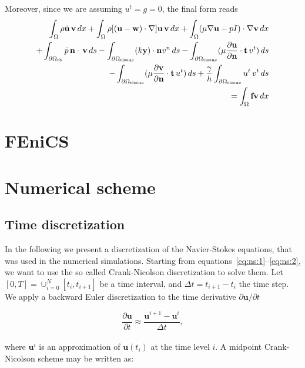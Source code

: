 \documentclass[11pt,a4paper,titlepage]{report}
\begin{document}
Moreover, since we are assuming $u^t = g = 0$, the final form reads
\begin{equation}
\begin{split}
 \int_{\Omega} \rho \dot{\mathbf{u}} \, \mathbf{v} \, dx
+ \int_{\Omega} \rho [(\mathbf{u - w}) \cdot \nabla] \mathbf{u} \, \mathbf{v} \, dx
+ \int_{\Omega} (\mu \nabla \mathbf{u} - pI) \cdot \nabla \mathbf{v} \, dx \\
+ \int_{\partial \Omega_{\rm tb}} \bar{p} \, \mathbf{n} \cdot \, \mathbf{v} \, ds  %
- \int_{\partial \Omega_{\rm tissue}} (k \mathbf{y}) \cdot \mathbf{n} v^n \, ds 
- \int_{\partial \Omega_{\rm tissue}} (\mu \frac{\partial \mathbf{u}}{\partial \mathbf{n}} \cdot \mathbf{t} \, v^t) \, ds \\
- \int_{\partial \Omega_{\rm tissue}} (\mu \frac{\partial \mathbf{v}}{\partial \mathbf{n}} \cdot \mathbf{t} \, u^t) \, ds 
+ \frac{\gamma}{h} \int_{\partial \Omega_{\rm tissue}} u^t \, v^t \, ds \\
= \int_{\Omega} \mathbf{f} \mathbf{v} \, dx
\end{split}
\end{equation}


\section{FEniCS}

\section{Numerical scheme}

\subsection{Time discretization}
In the following we present a discretization of the Navier-Stokes equations, that was used in the numerical simulations. Starting from equations~\eqref{eq:ns:1}--\eqref{eq:ns:2}, we want to use the so called Crank-Nicolson discretization to solve them. Let $[0, T] = \cup^N_{i=0} [t_i, t_{i+1}] $ be a time interval, and $\Delta t = t_{i+1} - t_i$ the time step. We apply a backward Euler discretization to the time derivative $\partial \mathbf{u}/ \partial t$

\begin{equation}
\frac{\partial \mathbf{u}}{\partial t} \approx \frac{\mathbf{u}^{i+1} -\mathbf{u}^i }{\Delta t},
\end{equation}
\\
where $\mathbf{u}^i$ is an approximation of $\mathbf{u}(t_i)$ at the time level $i$. A midpoint Crank-Nicolson scheme may be written as:
\end{document}

